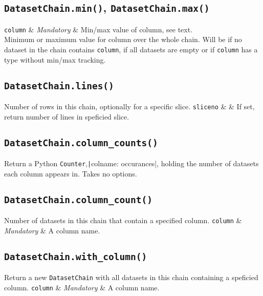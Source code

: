 \subsection{\texttt{DatasetChain.min()}, \texttt{DatasetChain.max()}}
\begin{leftbar}
\starttable
\texttt{column} & \textsl{Mandatory} & Min/max value of column, see text.\\
\stoptable
Minimum or maximum value for column over the whole chain.  Will be
\pyNone if no dataset in the chain contains \texttt{column}, if all datasets are
empty or if \texttt{column} has a type without min/max tracking.
\end{leftbar}


\subsection{\texttt{DatasetChain.lines()}}
\begin{leftbar}
Number of rows in this chain, optionally for a specific slice.
\starttable
\texttt{sliceno} & \pyNone & If set, return number of lines in speficied slice.\\
\stoptable
\end{leftbar}


\subsection{\texttt{DatasetChain.column\_counts()}}
\begin{leftbar}
Return a Python \texttt{Counter},\texttt|{colname:
occurances}|, holding the number of datasets each column appears in.
Takes no options.
\end{leftbar}


\subsection{\texttt{DatasetChain.column\_count()}}
\begin{leftbar}
Number of datasets in this chain that contain a specified column.
\starttable
\texttt{column} & \textsl{Mandatory} & A column name.\\
\stoptable
\end{leftbar}


\subsection{\texttt{DatasetChain.with\_column()}}
\begin{leftbar}
Return a new \texttt{DatasetChain} with all datasets in this chain
containing a speficied column.
\starttable
\texttt{column} & \textsl{Mandatory} & A column name.\\
\stoptable
\end{leftbar}




